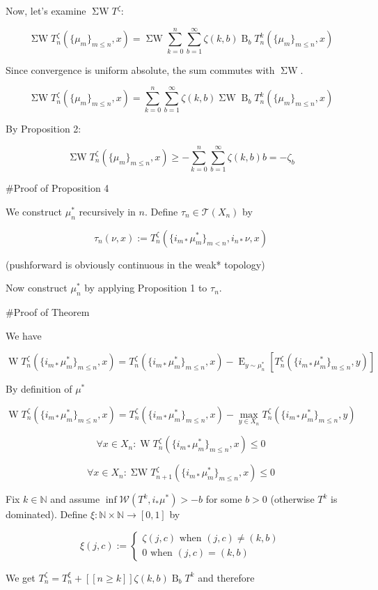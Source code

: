 \documentclass[a4paper]{article}
\DeclareMathOperator{\E}{E}
\newcommand{\Nats}{\mathbb{N}}
\newcommand{\B}{\operatorname{B}_b}
\newcommand{\W}{\operatorname{W}}
\newcommand{\SW}{\operatorname{\Sigma W}}
\newcommand{\Wo}{\mathcal{W}}
\begin{document}
Now, let's examine ${\SW T^\zeta}$:

$$\SW T^\zeta_n(\{\mu_m \}_{m \leq n},x)=\SW \sum_{k=0}^n \sum_{b=1}^\infty \zeta(k,b) \B T^k_n(\{\mu_m \}_{m \leq n},x)$$

Since convergence is uniform absolute, the sum commutes with ${\SW}$.

$$\SW T^\zeta_n(\{\mu_m \}_{m \leq n},x)=\sum_{k=0}^n \sum_{b=1}^\infty \zeta(k,b) \SW \B T^k_n(\{\mu_m \}_{m \leq n},x)$$

By Proposition 2:


$$\SW T^\zeta_n(\{\mu_m \}_{m \leq n},x)\geq -\sum_{k=0}^n \sum_{b=1}^\infty \zeta(k,b)b = -\zeta_b$$

\#Proof of Proposition 4

We construct ${\mu^*_n}$ recursively in ${n}$. Define ${\tau_n \in \mathcal{T}(X_n)}$ by

$$\tau_n(\nu,x):=T_n^\zeta(\{i_{m*}\mu^*_m\}_{m<n}, i_{n*} \nu, x)$$

(pushforward is obviously continuous in the weak* topology)

Now construct ${\mu^*_n}$ by applying Proposition 1 to ${\tau_n}$.

\#Proof of Theorem

We have

$$\W T^\zeta_n(\{i_{m*}\mu^*_m\}_{m \leq n}, x) = T^\zeta_n(\{i_{m*}\mu^*_m\}_{m \leq n}, x) - \E_{y \sim \mu_n^*}[T^\zeta_n(\{i_{m*}\mu^*_m\}_{m \leq n}, y)]$$

By definition of ${\mu^*}$

$$\W T^\zeta_n(\{i_{m*}\mu^*_m\}_{m \leq n}, x) = T^\zeta_n(\{i_{m*}\mu^*_m\}_{m \leq n}, x) - \max_{y \in X_n} T^\zeta_n(\{i_{m*}\mu^*_m\}_{m \leq n}, y)$$

$$\forall x \in X_n: \W T^\zeta_n(\{i_{m*}\mu^*_m\}_{m \leq n}, x) \leq 0$$

$$\forall x \in X_n: \SW T^\zeta_{n+1}(\{i_{m*}\mu^*_m\}_{m \leq n}, x) \leq 0$$

Fix ${k \in \Nats}$ and assume ${\inf \Wo(T^k,i_*\mu^*) > -b}$ for some ${b > 0}$ (otherwise ${T^k}$ is dominated). Define ${\xi: \Nats \times \Nats \rightarrow [0,1]}$ by

$$\xi(j,c):=\begin{cases}\zeta(j,c) \text { when } (j,c) \ne (k,b)\\0 \text{ when } (j,c)=(k,b)\end{cases}$$

We get ${T^\zeta_n = T^\xi_n + [[n \geq k]] \zeta(k,b) \B T^k}$ and therefore
\end{document}
